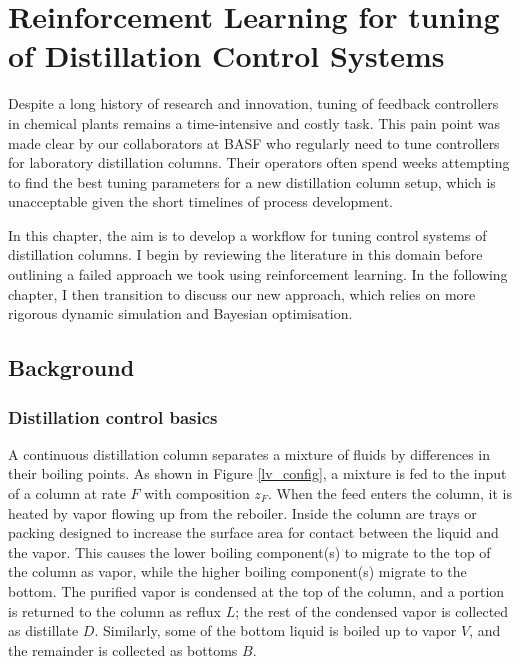 \chapter{Reinforcement Learning for tuning of  Distillation Control Systems}\label{ch:rl_tuning} 
Despite a long history of research and innovation, tuning of feedback controllers in chemical plants remains a time-intensive and costly task. This pain point was made clear by our collaborators at BASF who regularly need to tune controllers for laboratory distillation columns. Their operators often spend weeks attempting to find the best tuning parameters for a new distillation column setup, which is unacceptable given the short timelines of process development.

In this chapter, the aim is to develop a workflow for tuning control systems of distillation columns. I begin by reviewing the literature in this domain before outlining a failed approach we took using reinforcement learning.  In the following chapter, I then transition to discuss our new approach, which relies on more rigorous dynamic simulation and Bayesian optimisation.

\section{Background}


\subsection{Distillation control basics}
A continuous distillation column separates a mixture of fluids by differences in their boiling points. As shown in Figure \ref{lv_config}, a mixture is fed to the input of a column at rate $F$ with composition $z_F$.  When the feed enters the column, it is heated by vapor flowing up from the reboiler. Inside the column are trays or packing designed to increase the surface area for contact between the liquid and the vapor. This causes the lower boiling component(s) to migrate to the top of the column as vapor, while the higher boiling component(s) migrate to the bottom. The purified vapor is condensed at the top of the column, and a portion is returned to the column as reflux $L$; the rest of the condensed vapor is collected as distillate $D$. Similarly, some of the bottom liquid is boiled up to vapor $V$, and the remainder is collected as bottoms $B$.


